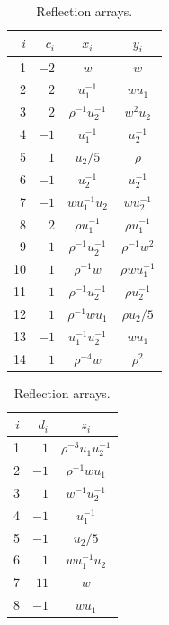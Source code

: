 \documentclass[11pt,reqno]{amsart}
\theoremstyle{remark}
\numberwithin{equation}{section}
\begin{document}
\begin{table}[H]
\begin{minipage}[t]{0.57\textwidth}
\caption{Five-term arrays.}\label{tab:five}
\centering\small
\renewcommand{\arraystretch}{1.18}
\begin{tabular}{@{}rrcc@{}}\toprule
$i$&$c_i$&$x_i$&$y_i$\\\midrule
1&$-2$&$w$&$w$\\
2&$2$&$u_1^{-1}$&$wu_1$\\
3&$2$&$\rho^{-1}u_2^{-1}$&$w^2u_2$\\
4&$-1$&$u_1^{-1}$&$u_2^{-1}$\\
5&$1$&$u_2/5$&$\rho$\\
6&$-1$&$u_2^{-1}$&$u_2^{-1}$\\
7&$-1$&$wu_1^{-1}u_2$&$wu_2^{-1}$\\
8&$2$&$\rho u_1^{-1}$&$\rho u_1^{-1}$\\
9&$1$&$\rho^{-1}u_2^{-1}$&$\rho^{-1}w^2$\\
10&$1$&$\rho^{-1}w$&$\rho wu_1^{-1}$\\
11&$1$&$\rho^{-1}u_2^{-1}$&$\rho u_2^{-1}$\\
12&$1$&$\rho^{-1}wu_1$&$\rho u_2/5$\\
13&$-1$&$u_1^{-1}u_2^{-1}$&$wu_1$\\
14&$1$&$\rho^{-4}w$&$\rho^2$\\\bottomrule
\end{tabular}
\end{minipage}\hfill
\begin{minipage}[t]{0.40\textwidth}
\caption{Reflection arrays.}\label{tab:reflection}
\centering\small
\renewcommand{\arraystretch}{1.18}
\begin{tabular}{@{}rrc@{}}\toprule
$i$&$d_i$&$z_i$\\\midrule
1&$1$&$\rho^{-3}u_1u_2^{-1}$\\
2&$-1$&$\rho^{-1}wu_1$\\
3&$1$&$w^{-1}u_2^{-1}$\\
4&$-1$&$u_1^{-1}$\\
5&$-1$&$u_2/5$\\
6&$1$&$wu_1^{-1}u_2$\\
7&$11$&$w$\\
8&$-1$&$wu_1$\\\bottomrule
\end{tabular}
\end{minipage}
\end{table}
\end{document}

